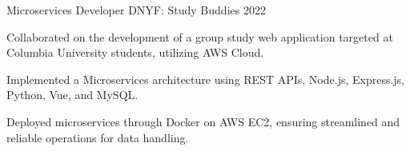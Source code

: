 
\begin{cventries}

          \cventry
            {Microservices Developer} %
            {DNYF: Study Buddies} %
            {} %
            {2022} %
            {
              \begin{cvitems} %
              \item {Collaborated on the development of a group study web application targeted at Columbia University students, utilizing AWS Cloud.}
    \item {Implemented a Microservices architecture using REST APIs, Node.js, Express.js, Python, Vue, and MySQL.}
    \item {Deployed microservices through Docker on AWS EC2, ensuring streamlined and reliable operations for data handling.}
              \end{cvitems}
            }
\end{cventries}
